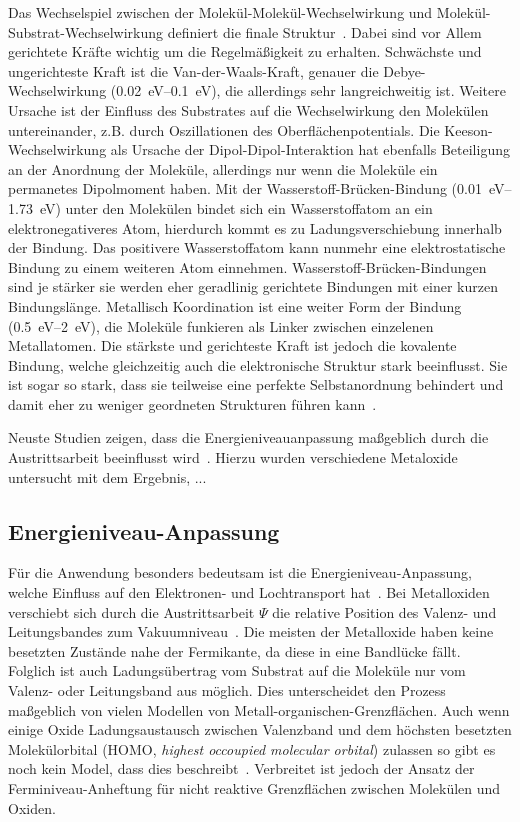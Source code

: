             Das Wechselspiel zwischen der Molekül-Molekül-Wechselwirkung und Molekül-Substrat-Wechselwirkung definiert die finale Struktur~\cite{IF_1}.
            Dabei sind vor Allem gerichtete Kräfte wichtig um die Regelmäßigkeit zu erhalten.
            Schwächste und ungerichteste Kraft ist die Van-der-Waals-Kraft, genauer die Debye-Wechselwirkung (\SIrange{0.02}{0.1}{\electronvolt}), die allerdings sehr langreichweitig ist.
            Weitere Ursache ist der Einfluss des Substrates auf die Wechselwirkung den Molekülen untereinander, z.B. durch Oszillationen des Oberflächenpotentials.
            Die Keeson-Wechselwirkung als Ursache der Dipol-Dipol-Interaktion hat ebenfalls Beteiligung an der Anordnung der Moleküle, allerdings nur wenn die Moleküle ein permanetes Dipolmoment haben.
            Mit der Wasserstoff-Brücken-Bindung (\SIrange{0.01}{1.73}{\electronvolt}) unter den Molekülen bindet sich ein Wasserstoffatom an ein elektronegativeres Atom, hierdurch kommt es zu Ladungsverschiebung innerhalb der Bindung.
            Das positivere Wasserstoffatom kann nunmehr eine elektrostatische Bindung zu einem weiteren Atom einnehmen.
            Wasserstoff-Brücken-Bindungen sind je stärker sie werden eher geradlinig gerichtete Bindungen mit einer kurzen Bindungslänge.
            Metallisch Koordination ist eine weiter Form der Bindung (\SIrange{0.5}{2}{\electronvolt}), die Moleküle funkieren als Linker zwischen einzelenen Metallatomen.
            Die stärkste und gerichteste Kraft ist jedoch die kovalente Bindung, welche gleichzeitig auch die elektronische Struktur stark beeinflusst.
            Sie ist sogar so stark, dass sie teilweise eine perfekte Selbstanordnung behindert und damit eher zu weniger geordneten Strukturen führen kann~\cite{IF_1}.

            Neuste Studien zeigen, dass die Energieniveauanpassung maßgeblich durch die Austrittsarbeit beeinflusst wird~\cite{IF_3}.
            Hierzu wurden verschiedene Metaloxide untersucht mit dem Ergebnis, ...

        \subsection{Energieniveau-Anpassung}
            Für die Anwendung besonders bedeutsam ist die Energieniveau-Anpassung, welche Einfluss auf den Elektronen- und Lochtransport hat~\cite{IF_4}.
            Bei Metalloxiden verschiebt sich durch die Austrittsarbeit $\Psi$ die relative Position des Valenz- und Leitungsbandes zum Vakuumniveau~\cite{IF_3}.
            Die meisten der Metalloxide haben keine besetzten Zustände nahe der Fermikante, da diese in eine Bandlücke fällt.
            Folglich ist auch Ladungsübertrag vom Substrat auf die Moleküle nur vom Valenz- oder Leitungsband aus möglich.
            Dies unterscheidet den Prozess maßgeblich von vielen Modellen von Metall-organischen-Grenzflächen.
            Auch wenn einige Oxide Ladungsaustausch zwischen Valenzband und dem höchsten besetzten Molekülorbital (HOMO, \textit{highest occoupied molecular orbital}) zulassen so  gibt es noch kein Model, dass dies beschreibt~\cite{IF_3}.
            Verbreitet ist jedoch der Ansatz der Ferminiveau-Anheftung für nicht reaktive Grenzflächen zwischen Molekülen und Oxiden.

